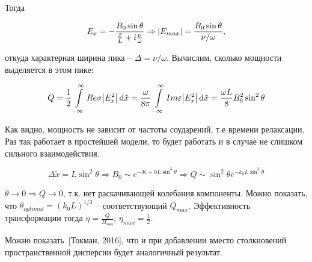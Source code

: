 \documentclass[10pt, a4paper]{article}
\newcommand{\Tokman}{~[Токман, 2016]}
\begin{document}
Тогда

\begin{equation*}
	E_x = -\frac{B_0\sin\theta}{\frac{\tilde{x}}{L}+i\frac{\nu}{\omega}} \Rightarrow \abs{E_{max}} = \frac{B_0\sin\theta}{\nu/\omega},
\end{equation*}

откуда характерная ширина пика -- $\Delta = \nu/\omega$. Вычислим, сколько мощности выделяется в этом пике:

\begin{equation*}
	Q = \frac{1}{2}\int\limits_{-\infty}^\infty Re\sigma\abs{E_x^2}\dd{\tilde{x}} = \frac{\omega}{8\pi} \int\limits_{-\infty}^\infty Im\varepsilon \abs{E_x^2}\dd{\tilde{x}} = \frac{\omega L}{8}B_0^2 \sin^2\theta 
\end{equation*}

Как видно, мощность не зависит от частоты соударений, т.е времени релаксации. Раз так работает в простейшей модели, то будет работать и в случае не слишком сильного взаимодействия.

\begin{equation*}
	\Delta \tilde{x} = L\sin^2\theta \Rightarrow B_0\sim e^{-K-0L\sin^3\theta} \Rightarrow Q \sim \sin^2\theta e^{-k_0L\sin^3\theta}
\end{equation*}

$\theta\rightarrow0\Rightarrow Q\rightarrow 0$, т.к. нет раскачивающей колебания компоненты. Можно показать, что $\theta_{optimal} = (k_0L)^{1/3}$ -- соответствующий $Q_{max}$. Эффективность трансформации тогда $\eta = \frac{Q}{\Pi_\text{пад}}$, $\eta_{max} = \frac{1}{2}$. 

Можно показать\Tokman, что и при добавлении вместо столкновений пространственной дисперсии будет аналогичный результат.
\end{document}
